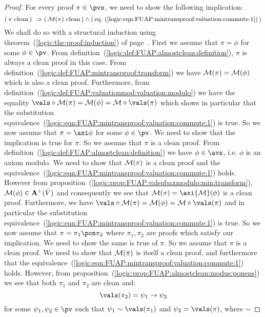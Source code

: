 \begin{proof}
For every proof $\pi\in\pvs$, we need to show the following
implication:
    \[
    (\,\mbox{$\pi$ clean}\,)\ \Rightarrow(\,\mbox{${\cal M}(\pi)$ clean}\,)
    \land(\,\mbox{eq.~(\ref{logic:eqn:FUAP:mintransproof:valuation:commute:1})}\,)
    \]
We shall do so with a structural induction using
theorem~(\ref{logic:the:proof:induction}) of
page~\pageref{logic:the:proof:induction}. First we assume that
$\pi=\phi$ for some $\phi\in\pv$. From
definition~(\ref{logic:def:FUAP:almostclean:definition}), $\pi$ is
always a clean proof in this case. From
definition~(\ref{logic:def:FUAP:mintransproof:transform}) we have
${\cal M}(\pi)={\cal M}(\phi)$ which is also a clean proof.
Furthermore, from
definition~(\ref{logic:def:FUAP:valuationmod:valuation:modulo}) we
have the equality $\vals\circ{\cal M}(\pi)={\cal M}(\phi)={\cal
M}\circ\vals(\pi)$ which shows in particular that the substitution
equivalence~(\ref{logic:eqn:FUAP:mintransproof:valuation:commute:1})
is true. So we now assume that $\pi=\axi\phi$ for some $\phi\in\pv$.
We need to show that the implication is true for $\pi$. So we assume
that $\pi$ is a clean proof. From
definition~(\ref{logic:def:FUAP:almostclean:definition}) we have
$\phi\in\avs$, i.e. $\phi$ is an axiom modulo. We need to show that
${\cal M}(\pi)$ is a clean proof and the
equivalence~(\ref{logic:eqn:FUAP:mintransproof:valuation:commute:1})
holds. However from
proposition~(\ref{logic:prop:FUAP:valsubaxmodulo:min:transform}),
${\cal M}(\phi)\in{\bf A}^{+}(\bar{V})$ and consequently we see that
${\cal M}(\pi)=\axi{\cal M}(\phi)$ is a clean proof. Furthermore, we
have $\vals\circ{\cal M}(\pi)={\cal M}(\phi)={\cal
M}\circ\vals(\pi)$ and in particular the substitution
equivalence~(\ref{logic:eqn:FUAP:mintransproof:valuation:commute:1})
is true. So we now assume that $\pi=\pi_{1}\pon\pi_{2}$ where
$\pi_{1},\pi_{2}$ are proofs which satisfy our implication. We need
to show the same is true of $\pi$. So we assume that $\pi$ is a
clean proof. We need to show that ${\cal M}(\pi)$ is itself a clean
proof, and furthermore that the
equivalence~(\ref{logic:eqn:FUAP:mintransproof:valuation:commute:1})
holds. However, from
proposition~(\ref{logic:prop:FUAP:almostclean:modus:ponens}) we see
that both $\pi_{1}$ and $\pi_{2}$ are clean and:
    \begin{equation}\label{logic:eqn:FUAP:mintransproof:valuation:commute:2}
    \vals(\pi_{2})=\psi_{1}\to\psi_{2}
    \end{equation}
for some $\psi_{1},\psi_{2}\in\pv$ such that
$\psi_{1}\sim\vals(\pi_{1})$ and $\psi_{2}=\vals(\pi)$, where $\sim$

\end{proof}
